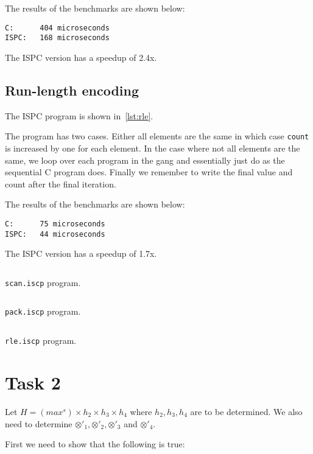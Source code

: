 \documentclass{article}
\begin{document}
The results of the benchmarks are shown below:
\begin{Verbatim}
C:      404 microseconds
ISPC:   168 microseconds
\end{Verbatim}
The ISPC version has a speedup of \textapprox 2.4x.

\subsection*{Run-length encoding}

\noindent
The ISPC program is shown in~\cref{lst:rle}.

The program has two cases. Either all elements are the same in which case
\verb|count| is increased by one for each element. In the case where not all
elements are the same, we loop over each program in the gang and essentially
just do as the sequential C program does. Finally we remember to write the final
value and count after the final iteration.

The results of the benchmarks are shown below:
\begin{Verbatim}
C:      75 microseconds
ISPC:   44 microseconds
\end{Verbatim}
The ISPC version has a speedup of \textapprox 1.7x.

\begin{listing}[p]
    \centering
    \inputminted{c}{../ispc-handout/scan.ispc}
    \caption{\texttt{scan.iscp} program.}
    \label{lst:scan}
\end{listing}
\begin{listing}[p]
    \centering
    \inputminted{c}{../ispc-handout/pack.ispc}
    \caption{\texttt{pack.iscp} program.}
    \label{lst:pack}
\end{listing}
\begin{listing}[p]
    \centering
    \inputminted{c}{../ispc-handout/rle.ispc}
    \caption{\texttt{rle.iscp} program.}
    \label{lst:rle}
\end{listing}

\FloatBarrier

\section*{Task 2}

Let $H = (max^s) \times h_2 \times h_3 \times h_4$ where $h_2 , h_3 , h_4$ are
to be determined. We also need to determine $\otimes'_1 , \otimes'_2 ,
\otimes'_3$ and $\otimes'_4$.

First we need to show that the following is true:
\end{document}
